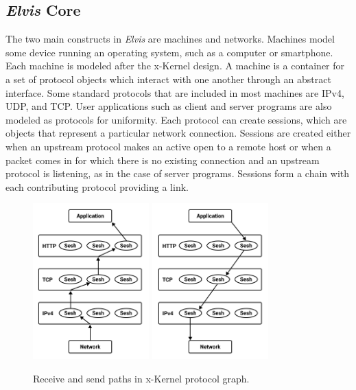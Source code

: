 \documentclass[journal]{IEEEtran} %
\newcommand{\elvis}{\textit{Elvis}}
\begin{document}
\subsection{\elvis{} Core}

The two main constructs in \elvis{} are machines and networks. Machines model some device running an operating system, such as a computer or smartphone. Each machine is modeled after the x-Kernel design. A machine is a container for a set of protocol objects which interact with one another through an abstract interface. Some standard protocols that are included in most machines are IPv4, UDP, and TCP. User applications such as client and server programs are also modeled as protocols for uniformity. Each protocol can create sessions, which are objects that represent a particular network connection. Sessions are created either when an upstream protocol makes an active open to a remote host or when a packet comes in for which there is no existing connection and an upstream protocol is listening, as in the case of server programs. Sessions form a chain with each contributing protocol providing a link.

\begin{figure}[htbp]
    \centerline{\includegraphics[height=6cm,keepaspectratio]{Images/Demux.jpg}
    \includegraphics[height=6cm,keepaspectratio]{Images/Send.jpg}}
    \caption{Receive and send paths in x-Kernel protocol graph.}
    \label{fig:xkernel}
\end{figure}
\end{document}
